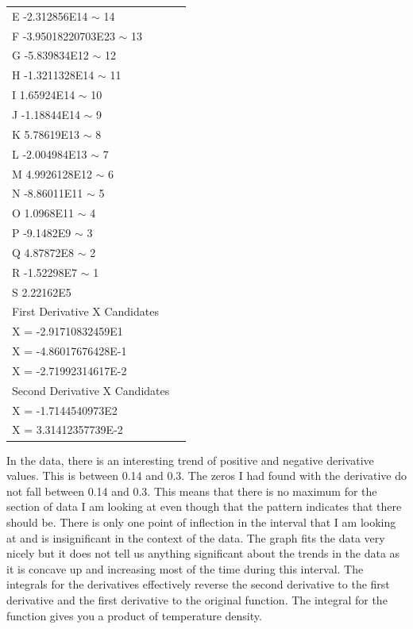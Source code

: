 \documentclass{article}
\begin{document}
\begin{table}[]
\begin{tabular}{@{}ll@{}}
E -2.312856E14 $\sim$ 14       &  \\
F -3.95018220703E23 $\sim$ 13  &  \\
G -5.839834E12 $\sim$ 12       &  \\
H -1.3211328E14 $\sim$ 11      &  \\
I 1.65924E14 $\sim$ 10         &  \\
J -1.18844E14 $\sim$ 9         &  \\
K 5.78619E13 $\sim$ 8          &  \\
L -2.004984E13 $\sim$ 7        &  \\
M 4.9926128E12 $\sim$ 6        &  \\
N -8.86011E11 $\sim$ 5         &  \\
O 1.0968E11 $\sim$ 4           &  \\
P -9.1482E9 $\sim$ 3           &  \\
Q 4.87872E8 $\sim$ 2           &  \\
R -1.52298E7 $\sim$ 1          &  \\
S 2.22162E5                    &  \\
First Derivative X Candidates  &  \\
X = -2.91710832459E1           &  \\
X = -4.86017676428E-1          &  \\
X = -2.71992314617E-2          &  \\
Second Derivative X Candidates &  \\
X = -1.7144540973E2            &  \\
X = 3.31412357739E-2           &  \\ \bottomrule
\end{tabular}
\end{table}

In the data, there is an interesting trend of positive and negative derivative values. This is between 0.14 and 0.3. The zeros I had found with the derivative do not fall between 0.14 and 0.3. This means that there is no maximum for the section of data I am looking at even though that the pattern indicates that there should be. There is only one point of inflection in the interval that I am looking at and is insignificant in the context of the data.
The graph fits the data very nicely but it does not tell us anything significant about the trends in the data as it is concave up and increasing most of the time during this interval.
The integrals for the derivatives effectively reverse the second derivative to the first derivative and the first derivative to the original function. The integral for the function gives you a product of temperature density.
\end{document}
